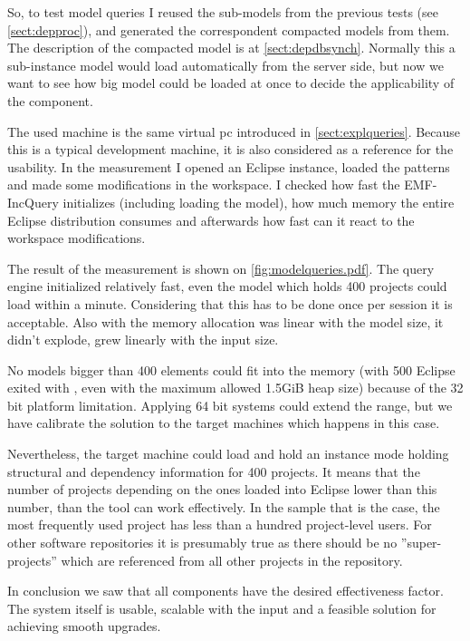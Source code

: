 So, to test model queries I reused the sub-models from the previous tests (see
\autoref{sect:depproc}), and generated the correspondent compacted models from
them.
The description of the compacted model is at \autoref{sect:depdbsynch}. Normally
this a sub-instance model would load automatically from the server side, but now
we want to see how big model could be loaded at once to decide the applicability
of the component.

The used machine is the same virtual pc introduced in
\autoref{sect:explqueries}. Because this is a typical development machine, it is
also considered as a reference for the usability. In the measurement I opened an
Eclipse instance, loaded the patterns and made some modifications in the
workspace. I checked how fast the EMF-IncQuery initializes (including loading
the model), how much memory the entire Eclipse distribution consumes and
afterwards how fast can it react to the workspace modifications.

The result of the measurement is shown on \autoref{fig:modelqueries.pdf}.
The query engine initialized relatively fast, even the model which holds 400
projects could load within a minute. Considering that this has to be done once
per session it is acceptable. Also with the memory allocation was linear with 
the model size, it didn't explode, grew linearly with the input size. 

No models bigger than 400 elements could fit into the memory (with 500 Eclipse
exited with , even with the maximum allowed 1.5GiB heap size)
because of the 32 bit platform limitation. Applying 64 bit systems could extend
the range, but we have calibrate the solution to the target machines which
happens in this case.

Nevertheless, the target machine could load and hold an instance mode holding
structural and dependency information for 400 projects. It means that the number
of projects depending on the ones loaded into Eclipse lower than this number,
than the tool can work effectively. In the sample that is the case, the most
frequently used project has less than a hundred project-level users. For other
 software repositories it is presumably true as there should be no
 ''super-projects'' which are referenced from all other projects in the
 repository.
 
In conclusion we saw that all components have the desired effectiveness factor.
The system itself is usable, scalable with the input and a feasible solution for
achieving smooth upgrades.
